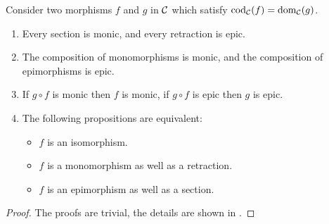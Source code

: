 \documentclass{article}
\begin{document}
\begin{cor}\label{a natural isomorphism}
	Consider two morphisms $f$ and $g$ in $\mathcal{C}$ which satisfy $\mathrm{cod}_{\mathcal{C}}(f)=\mathrm{dom}_{\mathcal{C}}(g)$.
	\begin{enumerate}
		\item Every section is monic, and every retraction is epic.
		\item The composition of monomorphisms is monic, and the composition of epimorphisms is epic.
		\item If $g\circ f$ is monic then $f$ is monic, if $g\circ f$ is epic then $g$ is epic.
		\item The following propositions are equivalent:
			\begin{itemize}
				\item $f$ is an isomorphism.
				\item $f$ is a monomorphism as well as a retraction.
				\item $f$ is an epimorphism as well as a section.
			\end{itemize}
	\end{enumerate}
\end{cor}

\begin{proof}
	The proofs are trivial, the details are shown in \cite[\S1.4]{cat-2}.
\end{proof}
\end{document}

